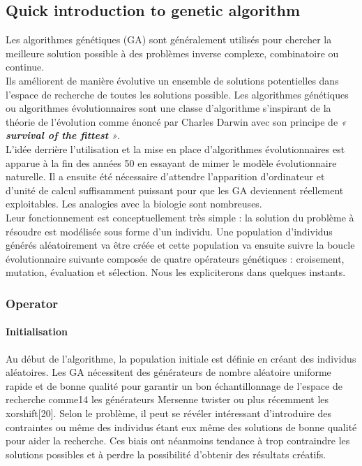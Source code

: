 \documentclass[12pt]{memoir}
\begin{document}
\subsection{Quick introduction to genetic algorithm} %
\label{sub:Quick introduction to genetic algorithm}
Les algorithmes génétiques (GA) sont généralement utilisés pour chercher
la meilleure solution possible à des problèmes inverse complexe,
combinatoire ou continue. \\
Ils améliorent de manière évolutive un ensemble de solutions
potentielles dans l'espace de recherche de toutes les solutions
possible. Les algorithmes génétiques ou algorithmes évolutionnaires sont
une classe d'algorithme s'inspirant de la théorie de l'évolution comme
énoncé par Charles Darwin avec son principe de \emph{« \textbf{survival
of the fittest} »}. \\ 
L'idée derrière l'utilisation et la mise en place
d'algorithmes évolutionnaires est apparue à la fin des années 50\cite{john1992adaptation} en
essayant de mimer le modèle évolutionnaire naturelle. Il a ensuite été
nécessaire d'attendre l'apparition d'ordinateur et d'unité de calcul
suffisamment puissant pour que les GA deviennent réellement
exploitables. Les analogies avec la biologie sont nombreuses. \\
Leur fonctionnement est conceptuellement très simple : la solution du
problème à résoudre est modélisée sous forme d'un individu. Une
population d'individus générés aléatoirement va être créée et cette
population va ensuite suivre la boucle évolutionnaire suivante composée
de quatre opérateurs génétiques : croisement, mutation, évaluation et
sélection. Nous les expliciterons dans quelques instants.


\subsubsection{Operator} %
\label{sub:}
\paragraph{Initialisation} %
\label{par:Initialisation}
Au début de l’algorithme, la population initiale est définie en créant des individus
aléatoires. Les GA nécessitent des générateurs de nombre aléatoire uniforme rapide et
de bonne qualité pour garantir un bon échantillonnage de l’espace de recherche comme14
les générateurs Mersenne twister ou plus récemment les xorshift[20].
Selon le problème, il peut se révéler intéressant d’introduire des contraintes ou même
des individus étant eux même des solutions de bonne qualité pour aider la recherche.
Ces biais ont néanmoins tendance à trop contraindre les solutions possibles et à perdre
la possibilité d’obtenir des résultats créatifs.
\end{document}
